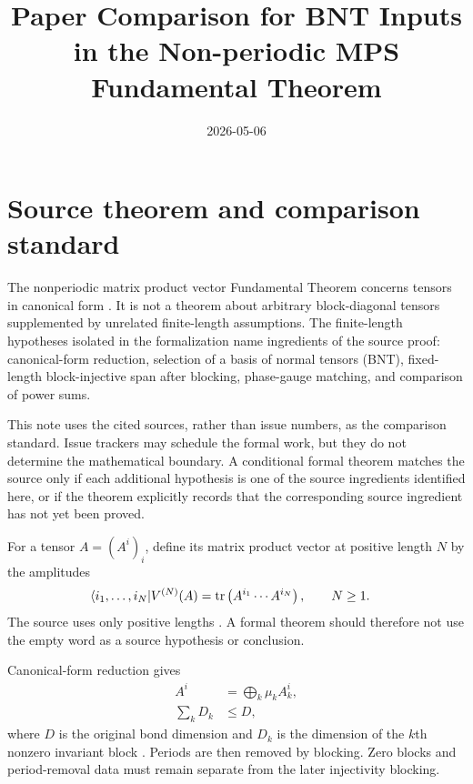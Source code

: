 \documentclass{article}
\title{Paper Comparison for BNT Inputs in the Non-periodic MPS Fundamental Theorem}
\author{}
\date{2026-05-06}
\begin{document}
\maketitle
{}

\section{Source theorem and comparison standard}

The nonperiodic matrix product vector Fundamental Theorem concerns tensors in
canonical form
\cite{Cirac2016MPDO_arXiv,Cirac2017MPDO_AnnPhys,Cirac2021Matrix}. It is not a
theorem about arbitrary block-diagonal tensors supplemented by unrelated
finite-length assumptions. The finite-length hypotheses isolated in the
formalization name ingredients of the source proof: canonical-form reduction,
selection of a basis of normal tensors (BNT), fixed-length block-injective span
after blocking, phase-gauge matching, and comparison of power sums.

This note uses the cited sources, rather than issue numbers, as the comparison
standard. Issue trackers may schedule the formal work, but they do not determine
the mathematical boundary. A conditional formal theorem matches the source
only if each additional hypothesis is one of the source ingredients identified
here, or if the theorem explicitly records that the corresponding source
ingredient has not yet been proved.

For a tensor $A=(A^i)_i$, define its matrix product vector at positive length
$N$ by the amplitudes
\begin{align}
    \langle i_1,\ldots,i_N|V^{(N)}(A)
        &=
        \operatorname{tr}\left(A^{i_1}\cdots A^{i_N}\right),
        \qquad N\geq 1.
    \label{eq:rmp_nonperiodic_bnt_comparison_inputs_positive_length_mpv}
\end{align}
The source uses only positive lengths
\cite[Definition~\texttt{MPV}, lines~130--151]{Cirac2016MPDO_arXiv}. A formal
theorem should therefore not use the empty word as a source hypothesis or
conclusion.

Canonical-form reduction gives
\begin{align}
    A^i
        &=
        \bigoplus_k \mu_k A_k^i,
    \label{eq:rmp_nonperiodic_bnt_comparison_inputs_canonical_blocks}\\
    \sum_k D_k
        &\leq D,
    \label{eq:rmp_nonperiodic_bnt_comparison_inputs_canonical_dimensions}
\end{align}
where $D$ is the original bond dimension and $D_k$ is the dimension of the
$k$th nonzero invariant block
\cite[lines~214--225]{Cirac2016MPDO_arXiv}. Periods are then removed by
blocking. Zero blocks and period-removal data must remain separate from the
later injectivity blocking.
\end{document}
